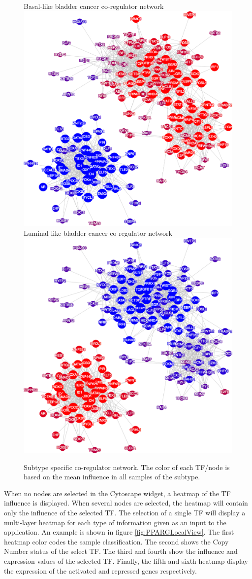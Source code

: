 \documentclass[12pt]{article}
\begin{document}
\begin{figure}[hp!]
\centering
{\LARGE Basal-like bladder cancer co-regulator network}
\includegraphics[width=0.7\linewidth]{fig/basal1}
\\
{\LARGE Luminal-like bladder cancer co-regulator network}
\includegraphics[width=0.7\linewidth]{fig/luminal1}
\caption{Subtype specific co-regulator network. The color of each TF/node is based on the mean influence in all samples of the subtype.}
\label{fig:subtypeCoreg}
\end{figure}

\newpage

When no nodes are selected in the Cytoscape widget, a heatmap of the TF influence is displayed. When several nodes are selected, the heatmap will contain only the influence of the selected TF.
The selection of a single TF will display a multi-layer heatmap for each type of information given as an input to the application.
An example is shown in figure \ref{fig:PPARGLocalView}.
The first heatmap color codes the sample classification. The second shows the Copy Number status of the select TF. The third and fourth show the influence and expression values of the selected TF. Finally, the fifth and sixth heatmap display the expression of the activated and repressed genes respectively.
\end{document}

